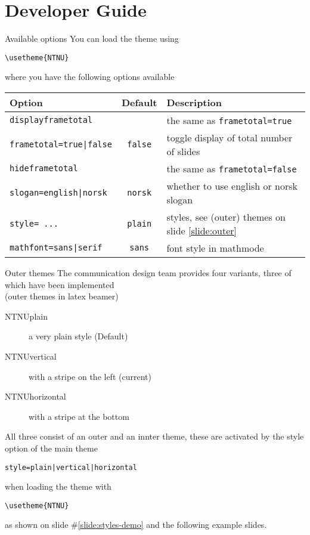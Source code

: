 \documentclass[aspectratio=169]{beamer}
\begin{document}
	{
		
		
		
	}


	\section{Developer Guide}
		\begin{frame}[fragile]{Available options}
			\label{slide:developer}
			You can load the theme using
			
			\lstinline!\usetheme{NTNU}!

			where you have the following options available

			\begin{tabular}{lcl}
				\toprule
				\textbf{Option} & \textbf{Default} &\textbf{Description} \\
				\midrule
				\lstinline!displayframetotal! && the same as \lstinline!frametotal=true! \\
				\lstinline!frametotal=true|false! & \lstinline!false! & toggle display of total number of slides\\
				\lstinline!hideframetotal! && the same as \lstinline!frametotal=false! \\
				\lstinline!slogan=english|norsk! & \lstinline!norsk! & whether to use english or norsk slogan\\
				\lstinline!style= ...! & \lstinline!plain! & styles, see (outer) themes on slide \ref{slide:outer}\\
				\lstinline!mathfont=sans|serif! & \lstinline!sans! & font style in mathmode\\
				\bottomrule
			\end{tabular}
		\end{frame}
		
		\begin{frame}[fragile]{Outer themes}
			\label{slide:outer}
			The communication design team provides four variants, three of which have been implemented
			\\\hfill{\small (outer themes in latex beamer)}

			\begin{description}
				\item[NTNUplain] a very plain style (Default)
				\item[NTNUvertical] with a stripe on the left (current)
				\item[NTNUhorizontal] with a stripe at the bottom
			\end{description}

			All three consist of an outer and an innter theme, these are activated by the style option of the main theme

			\lstinline!style=plain|vertical|horizontal!

			when loading the theme with

			\lstinline!\usetheme{NTNU}!

			as shown on slide \#\ref{slide:styles-demo} and the following example slides.
		\end{frame}
		
\end{document}

